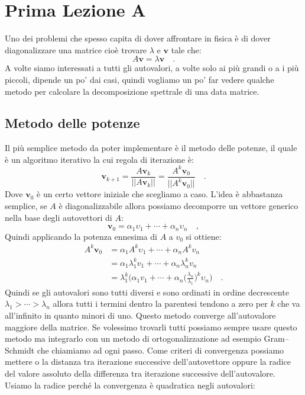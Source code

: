 \documentclass[10pt,a4paper]{article}
\begin{document}
\newpage

\section{Prima Lezione A}
Uno dei problemi che spesso capita di dover affrontare in fisica è di dover diagonalizzare una matrice cioè trovare $\lambda$ e $\textbf{v}$ tale che:
\begin{equation}
A \textbf{v} = \lambda \textbf{v} \quad.
\end{equation}
A volte siamo interessati a tutti gli autovalori, a volte solo ai più grandi o a i più piccoli, dipende un po' dai casi, quindi vogliamo un po' far vedere qualche metodo per calcolare la decomposizione spettrale di una data matrice.
\subsection{Metodo delle potenze}
Il più semplice metodo da poter implementare è il metodo delle potenze, il quale è un algoritmo iterativo la cui regola di iterazione è:
\begin{equation}
\textbf{v}_{k+1} = \frac{A \textbf{v}_k}{|| A \textbf{v}_k ||} = \frac{A^k \textbf{v}_0}{|| A^k \textbf{v}_0 ||} \quad.
\end{equation}
Dove $\textbf{v}_0$ è un certo vettore iniziale che scegliamo a caso.
L'idea è abbastanza semplice, se $A$ è diagonalizzabile allora possiamo decomporre un vettore generico nella base degli autovettori di $A$:
\begin{equation}
\textbf{v}_0 = \alpha_1 \upsilon_1 + \cdots + \alpha_n \upsilon_n  \quad,
\end{equation}
Quindi applicando la potenza ennesima di $A$ a $v_0$ si ottiene:
\begin{align}
A^{k} \textbf{v}_0 &= \alpha_1 A^k \upsilon_1 + \cdots + \alpha_n A^k v_n \\
&= \alpha_1 \lambda_1^k v_1 + \cdots + \alpha_n \lambda_n^k v_n \\
&= \lambda_1^k \bigg( \alpha_1 v_1 + \cdots + \alpha_n \bigg(\frac{\lambda_n}{\lambda_1}\bigg)^k \upsilon_n \bigg) \quad.	
\end{align}
Quindi se gli autovalori sono tutti diversi e sono ordinati in ordine decrescente $\lambda_1 > \cdots > \lambda_n$ allora tutti i termini dentro la parentesi tendono a zero per $k$ che va all'infinito in quanto minori di uno. Questo metodo converge all'autovalore maggiore della matrice. Se volessimo trovarli tutti possiamo sempre usare questo metodo ma integrarlo con un metodo di ortogonalizzazione ad esempio Gram–Schmidt che chiamiamo ad ogni passo. Come criteri di convergenza possiamo mettere o la distanza tra iterazione successive dell'autovettore oppure la radice del valore assoluto della differenza tra iterazione successive dell'autovalore. Usiamo la radice perché la convergenza è quadratica negli autovalori:
\end{document}
